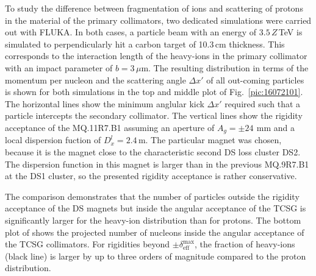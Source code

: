  
To study the difference between fragmentation of  \lead ions and scattering of protons in the material of the primary collimators, two dedicated simulations were carried out with FLUKA. In both cases, a particle beam with an energy of $3.5\,Z\,$TeV is simulated to perpendicularly hit a carbon target of 10.3$\,$cm thickness. This corresponds to the interaction length of the heavy-ions in the primary collimator with an impact parameter of $b=3\,\mu$m. The resulting distribution in terms of the momentum per nucleon and the scattering angle $\Delta x'$ of all out-coming particles is shown for both simulations in the top and middle plot of Fig.~\ref{pic:16072101}. The horizontal lines show the minimum anglular kick $\Delta x'$ required such that a particle intercepts the secondary collimator. The vertical lines show the rigidity acceptance of the MQ.11R7.B1 assuming an aperture of $A_g = \pm 24~\,$mm and a local dispersion fuction of $D_x^l = 2.4\,$m. The particular magnet was chosen, because it is the magnet close to the characteristic second DS loss cluster DS2. The dispersion function in this magnet is larger than in the previous MQ.9R7.B1 at the DS1 cluster, so the presented rigidity acceptance is rather conservative. 

The comparison demonstrates that the number of particles outside the rigidity acceptance of the DS magnets but inside the angular acceptance of the TCSG is significantly larger for the heavy-ion distribution than for protons. The bottom plot of  shows the projected number of nucleons inside the angular acceptance of the TCSG collimators. For rigidities beyond $\pm \delta_\text{eff}^\text{max}$, the fraction of heavy-ions (black line) is larger by up to three orders of magnitude compared to the proton distribution. 

